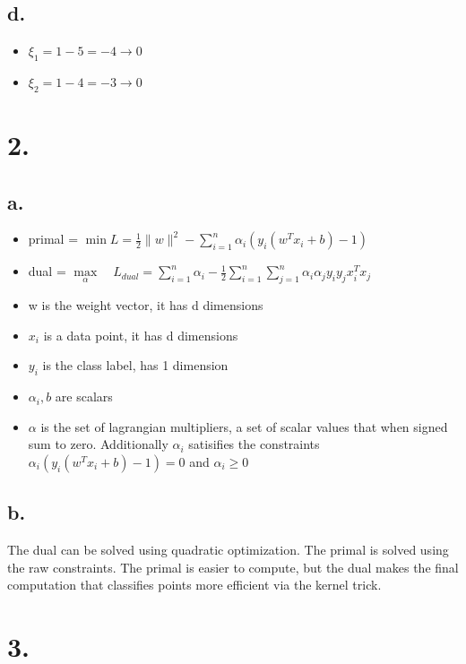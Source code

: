 \documentclass[11pt]{article}
\begin{document}
\subsection*{d.}
\label{sec:orgbc6e913}
\begin{itemize}
\item \(\xi_1 = 1 - 5 = -4  \rightarrow 0\)
\item \(\xi_2 = 1 - 4 = -3 \rightarrow 0\)
\end{itemize}
\section*{2.}
\label{sec:org0c4c907}

\subsection*{a.}
\label{sec:org7397a24}
\begin{itemize}
\item primal = \(\min L = \frac{1}{2}\|w\|^2 - \displaystyle \sum \limits^n_{i=1}\alpha_i(y_i(w^Tx_i +
  b)-1)\)
\item dual = \(\underset{\alpha}\max \quad L_{dual} = \displaystyle \sum\limits^n_{i=1}\alpha_i -
  \frac{1}{2}\displaystyle \sum\limits^n_{i=1}\displaystyle
  \sum\limits^n_{j=1}\alpha_i\alpha_jy_iy_jx^T_ix_j\)
\item w is the weight vector, it has d dimensions
\item \(x_i\) is a data point, it has d dimensions
\item \(y_i\) is the class label, has 1 dimension
\item \(\alpha_i, b\) are scalars
\item \(\alpha\) is the set of lagrangian multipliers, a set of scalar values that when signed
sum to zero. Additionally \(\alpha_i\) satisifies the constraints
\(\alpha_i(y_i(w^Tx_i + b)-1) = 0\) and \(\alpha_i \ge 0\)
\end{itemize}
\subsection*{b.}
\label{sec:org03bf989}
The dual can be solved using quadratic optimization. The primal is solved using
the raw constraints. The primal is easier to compute, but the dual makes the
final computation that classifies points more efficient via the kernel trick.
\section*{3.}
\label{sec:orgdbef19f}
\end{document}
